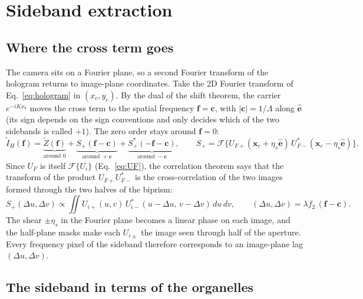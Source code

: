 \documentclass[11pt,a4paper]{article}
\newcommand{\ve}{\hat{\mathbf{e}}}
\newcommand{\FT}{\mathcal{F}}
\newcommand{\ee}{e}
\newcommand{\dd}{d}
\begin{document}
\section{Sideband extraction}
\label{sec:sideband}

\subsection{Where the cross term goes}

The camera sits on a Fourier plane, so a second Fourier transform of the
hologram returns to image-plane coordinates. Take the 2D Fourier transform of
Eq.~\eqref{eq:hologram} in $(x_c,y_c)$. By the dual of the shift theorem, the
carrier $\ee^{-iKx_b}$ moves the cross term to the spatial frequency
$\mathbf{f} = \mathbf{c}$, with $|\mathbf{c}| = 1/\Lambda$ along $\ve$ (its
sign depends on the sign conventions and only decides which of the two
sidebands is called $+1$). The zero order stays around $\mathbf{f} = 0$:
\begin{equation}
  \tilde I_H(\mathbf{f}) = \underbrace{\tilde Z(\mathbf{f})}_{\text{around } 0}
  + \underbrace{S_+(\mathbf{f}-\mathbf{c})}_{\text{around } +\mathbf{c}}
  + \underbrace{S_+^*(-\mathbf{f}-\mathbf{c})}_{\text{around } -\mathbf{c}},
  \qquad
  S_+ = \FT\big\{U_{F+}(\mathbf{x}_c+\eta_s\ve)\,U_{F-}^*(\mathbf{x}_c-\eta_s\ve)\big\}.
\end{equation}
Since $U_F$ is itself $\FT\{U_i\}$ (Eq.~\eqref{eq:UF}), the correlation theorem
says that the transform of the product $U_{F+}U_{F-}^*$ is the
cross-correlation of the two images formed through the two halves of the
biprism:
\begin{equation}
  S_+(\Delta u,\Delta v) \propto \iint U_{i+}(u,v)\,U_{i-}^*(u-\Delta u,\,v-\Delta v)\,\dd u\,\dd v,
  \qquad (\Delta u,\Delta v) = \lambda f_2\,(\mathbf{f}-\mathbf{c}).
  \label{eq:Scorr}
\end{equation}
The shear $\pm\eta_s$ in the Fourier plane becomes a linear phase on each
image, and the half-plane masks make each $U_{i\pm}$ the image seen through
half of the aperture. Every frequency pixel of the sideband therefore
corresponds to an image-plane lag $(\Delta u,\Delta v)$.

\subsection{The sideband in terms of the organelles}
\end{document}
